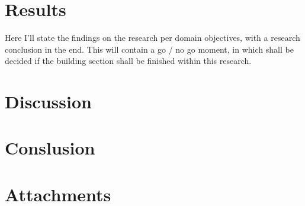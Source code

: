 \documentclass[12pt]{Thesis}
\begin{document}




\tableofcontents
\newpage








    
    
\chapter{Results}
Here I'll state the findings on the research per domain objectives, with a research conclusion in the end.
	This will contain a go / no go moment, in which shall be decided if the building section shall be finished within this research.
	

\chapter{Discussion}

\chapter{Conslusion}

\chapter{Attachments}


\end{document}
